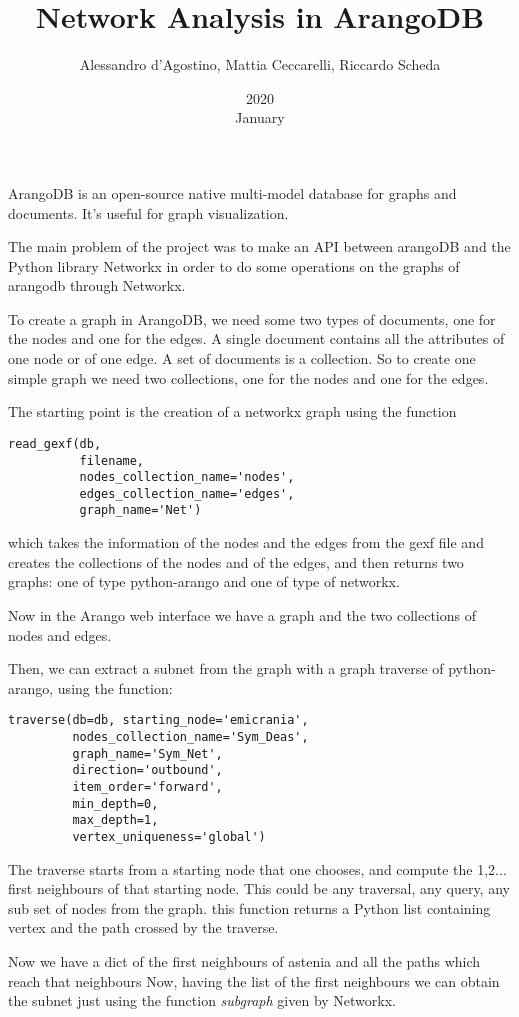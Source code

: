 \documentclass[11pt,twocolumn]{article}
\title{Network Analysis in ArangoDB}
\date{2020\\ January}
\author{Alessandro d'Agostino, Mattia Ceccarelli, Riccardo Scheda}
\begin{document}

ArangoDB is an open-source native multi-model database for graphs and documents.
It's useful for graph visualization.

The main problem of the project was to make an API between arangoDB and the Python library Networkx in order to do some operations on the graphs of arangodb through Networkx.

To create a graph in ArangoDB, we need some two types of documents, one for the nodes and one for the edges. A single document contains all the attributes of one node or of one edge. A set of documents is a collection. So to create one simple graph we need two collections, one for the nodes and one for the edges. 


The starting point is the creation of a networkx graph using the function 
\begin{verbatim}
read_gexf(db, 
          filename,
          nodes_collection_name='nodes', 
          edges_collection_name='edges',
          graph_name='Net')
\end{verbatim}
which takes the information of the nodes and the edges from the gexf file and creates the collections of the nodes and of the edges, and then returns two graphs: one of type python-arango and one of type of networkx.

Now in the Arango web interface we have a graph and the two collections of nodes and edges.


Then, we can extract a subnet from the graph with a graph traverse of python-arango, using the function:
\begin{verbatim}
traverse(db=db, starting_node='emicrania',
         nodes_collection_name='Sym_Deas',
         graph_name='Sym_Net',
         direction='outbound',
         item_order='forward',
         min_depth=0,
         max_depth=1,
         vertex_uniqueness='global')
\end{verbatim}

The traverse starts from a starting node that one chooses, and compute the 1,2... first neighbours of that starting node.
This could be any traversal, any query, any sub set of nodes from the graph.
this function returns a Python list containing vertex and the path crossed by the traverse.

Now we have a dict of the first neighbours of astenia and all the paths which reach that neighbours
Now, having the list of the first neighbours we can obtain the subnet just using the function \textit{subgraph} given by Networkx.
\end{document}
